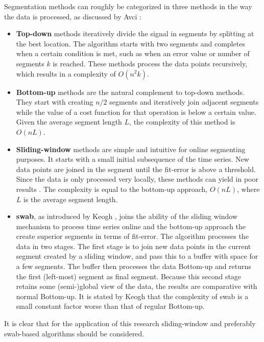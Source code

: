 Segmentation methods can roughly be categorized in three methods in the way the data is processed, as discussed by Avci \etal \cite{avci2010activity}:
\begin{itemize}
  \item \textbf{Top-down} methods iteratively divide the signal in segments by splitting at the best location.
  The algorithm starts with two segments and completes when a certain condition is met, such as when an error value or number of segments $k$ is reached.
  These methods process the data points recursively, which results in a complexity of $O(n^2k)$.
  \item \textbf{Bottom-up} methods are the natural complement to top-down methods.
  They start with creating $n/2$ segments and iteratively join adjacent segments while the value of a cost function for that operation is below a certain value.
  Given the average segment length $L$, the complexity of this method is $O(nL)$.
  \item \textbf{Sliding-window} methods are simple and intuitive for online segmenting purposes.
  It starts with a small initial subsequence of the time series.
  New data points are joined in the segment until the fit-error is above a threshold.
  Since the data is only processed very locally, these methods can yield in poor results \cite{keogh2001online}.
  The complexity is equal to the bottom-up approach, $O(nL)$, where $L$ is the average segment length.
  \item \textbf{\acrlong{swab}}, as introduced by Keogh \etal \cite{keogh2001online}, joins the ability of the sliding window mechanism to process time series online and the bottom-up approach the create superior segments in terms of fit-error.
  The algorithm processes the data in two stages.
  The first stage is to join new data points in the current segment created by a sliding window, and pass this to a buffer with space for a few segments.
  The buffer then processes the data Bottom-up and returns the first (left-most) segment as final segment.
  Because this second stage retains some (semi-)global view of the data, the results are comparative with normal Bottom-up.
  It is stated by Keogh \etal that the complexity of \gls{swab} is a small constant factor worse than that of regular Bottom-up.
\end{itemize}
It is clear that for the application of this research sliding-window and preferably \gls{swab}-based algorithms should be considered.

